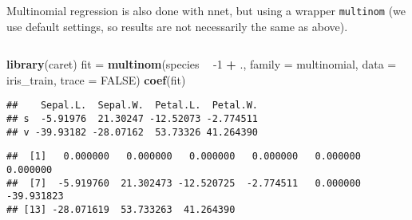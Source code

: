 \documentclass[10pt,ignorenonframetext,]{beamer}
\newenvironment{Shaded}{\begin{snugshade}}{\end{snugshade}}
\newcommand{\DataTypeTok}[1]{\textcolor[rgb]{0.13,0.29,0.53}{#1}}
\newcommand{\DecValTok}[1]{\textcolor[rgb]{0.00,0.00,0.81}{#1}}
\newcommand{\KeywordTok}[1]{\textcolor[rgb]{0.13,0.29,0.53}{\textbf{#1}}}
\newcommand{\NormalTok}[1]{#1}
\newcommand{\OperatorTok}[1]{\textcolor[rgb]{0.81,0.36,0.00}{\textbf{#1}}}
\newcommand{\OtherTok}[1]{\textcolor[rgb]{0.56,0.35,0.01}{#1}}
\newcommand{\StringTok}[1]{\textcolor[rgb]{0.31,0.60,0.02}{#1}}
\begin{document}
\begin{frame}[fragile]

Multinomial regression is also done with nnet, but using a wrapper
\texttt{multinom} (we use default settings, so results are not
necessarily the same as above).

\(~\)

\scriptsize

\begin{Shaded}
\begin{Highlighting}[]
\KeywordTok{library}\NormalTok{(caret)}
\NormalTok{fit =}\StringTok{ }\KeywordTok{multinom}\NormalTok{(species }\OperatorTok{~}\StringTok{ }\DecValTok{-1} \OperatorTok{+}\StringTok{ }\NormalTok{., }\DataTypeTok{family =}\NormalTok{ multinomial, }\DataTypeTok{data =}\NormalTok{ iris_train, }
    \DataTypeTok{trace =} \OtherTok{FALSE}\NormalTok{)}
\KeywordTok{coef}\NormalTok{(fit)}
\end{Highlighting}
\end{Shaded}

\begin{verbatim}
##    Sepal.L.  Sepal.W.  Petal.L.  Petal.W.
## s  -5.91976  21.30247 -12.52073 -2.774511
## v -39.93182 -28.07162  53.73326 41.264390
\end{verbatim}

\begin{Shaded}
\end{Shaded}

\begin{verbatim}
##  [1]   0.000000   0.000000   0.000000   0.000000   0.000000   0.000000
##  [7]  -5.919760  21.302473 -12.520725  -2.774511   0.000000 -39.931823
## [13] -28.071619  53.733263  41.264390
\end{verbatim}

\end{frame}
\end{document}
